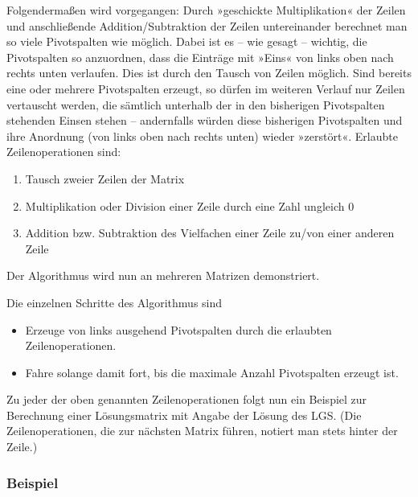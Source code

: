 Folgendermaßen wird vorgegangen: Durch »geschickte Multiplikation« der Zeilen und anschließende Addition/Subtraktion der Zeilen untereinander berechnet man so viele Pivotspalten wie möglich. Dabei ist es -- wie gesagt -- wichtig, die Pivotspalten so anzuordnen, dass die Einträge mit »Eins« von links oben nach rechts unten verlaufen. Dies ist durch den Tausch von Zeilen möglich. Sind bereits eine oder mehrere Pivotspalten erzeugt, so dürfen im weiteren Verlauf nur Zeilen vertauscht werden, die sämtlich unterhalb der in den bisherigen Pivotspalten stehenden Einsen stehen -- andernfalls würden diese bisherigen Pivotspalten und ihre Anordnung (von links oben nach rechts unten) wieder »zerstört«.
Erlaubte Zeilenoperationen sind:
\begin{enumerate}
  \item Tausch zweier Zeilen der Matrix
  \item Multiplikation oder Division einer Zeile durch eine Zahl ungleich 0
  \item Addition bzw. Subtraktion des Vielfachen einer Zeile zu/von einer anderen Zeile
\end{enumerate}

Der Algorithmus wird nun an mehreren Matrizen demonstriert.

Die einzelnen Schritte des Algorithmus sind
\begin{itemize}
  \item Erzeuge von links ausgehend Pivotspalten durch die erlaubten Zeilenoperationen.
  \item Fahre solange damit fort, bis die maximale Anzahl Pivotspalten erzeugt ist.
\end{itemize}

Zu jeder der oben genannten Zeilenoperationen folgt nun ein Beispiel zur Berechnung einer Lösungsmatrix mit Angabe der Lösung des LGS. (Die Zeilenoperationen, die zur nächsten Matrix führen, notiert man stets hinter der Zeile.)

\subsubsection{Beispiel}

